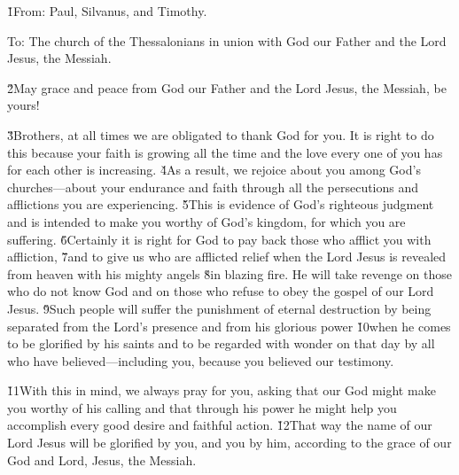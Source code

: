 


\v{1}From: Paul, Silvanus, and Timothy.

To: The church of the Thessalonians in union with God our Father and the Lord Jesus, the Messiah.

\v{2}May grace and peace from God our Father and the Lord Jesus, the Messiah, be yours!

\v{3}Brothers, at all times we are obligated to thank God for you. It is right to do this because your faith is growing all the time and the love every one of you has for each other is increasing. \v{4}As a result, we rejoice about you among God's churches---about your endurance and faith through all the persecutions and afflictions you are experiencing. \v{5}This is evidence of God's righteous judgment and is intended to make you worthy of God's kingdom, for which you are suffering. \v{6}Certainly it is right for God to pay back those who afflict you with affliction, \v{7}and to give us who are afflicted relief when the Lord Jesus is revealed from heaven with his mighty angels \v{8}in blazing fire. He will take revenge on those who do not know God and on those who refuse to obey the gospel of our Lord Jesus. \v{9}Such people will suffer the punishment of eternal destruction by being separated from the Lord's presence and from his glorious power \v{10}when he comes to be glorified by his saints and to be regarded with wonder on that day by all who have believed---including you, because you believed our testimony.

\v{11}With this in mind, we always pray for you, asking that our God might make you worthy of his calling and that through his power he might help you accomplish every good desire and faithful action. \v{12}That way the name of our Lord Jesus will be glorified by you, and you by him, according to the grace of our God and Lord, Jesus, the Messiah.

